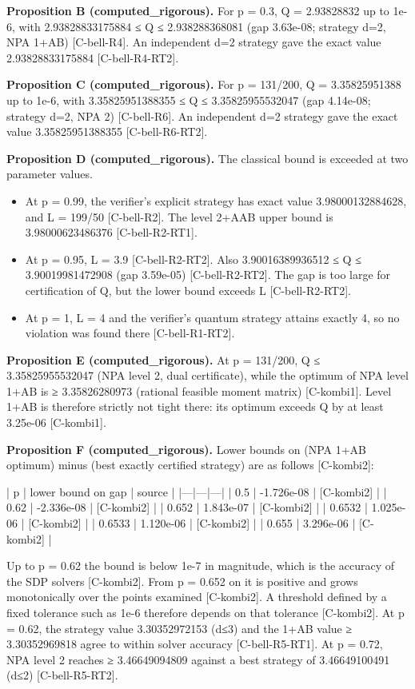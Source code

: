 \documentclass[10pt,twocolumn]{article}
\begin{document}
\textbf{Proposition B (computed_rigorous).} For p = 0.3, Q = 2.93828832 up to 1e-6, with 2.93828833175884 ≤ Q ≤ 2.938288368081 (gap 3.63e-08; strategy d=2, NPA 1+AB) {\scriptsize[C-bell-R4]}. An independent d=2 strategy gave the exact value 2.93828833175884 {\scriptsize[C-bell-R4-RT2]}.

\textbf{Proposition C (computed_rigorous).} For p = 131/200, Q = 3.35825951388 up to 1e-6, with 3.35825951388355 ≤ Q ≤ 3.35825955532047 (gap 4.14e-08; strategy d=2, NPA 2) {\scriptsize[C-bell-R6]}. An independent d=2 strategy gave the exact value 3.35825951388355 {\scriptsize[C-bell-R6-RT2]}.

\textbf{Proposition D (computed_rigorous).} The classical bound is exceeded at two parameter values.
\begin{itemize}
\item At p = 0.99, the verifier's explicit strategy has exact value 3.98000132884628, and L = 199/50 {\scriptsize[C-bell-R2]}. The level 2+AAB upper bound is 3.98000623486376 {\scriptsize[C-bell-R2-RT1]}.
\item At p = 0.95, L = 3.9 {\scriptsize[C-bell-R2-RT2]}. Also 3.90016389936512 ≤ Q ≤ 3.90019981472908 (gap 3.59e-05) {\scriptsize[C-bell-R2-RT2]}. The gap is too large for certification of Q, but the lower bound exceeds L {\scriptsize[C-bell-R2-RT2]}.
\item At p = 1, L = 4 and the verifier's quantum strategy attains exactly 4, so no violation was found there {\scriptsize[C-bell-R1-RT2]}.
\end{itemize}

\textbf{Proposition E (computed_rigorous).} At p = 131/200, Q ≤ 3.35825955532047 (NPA level 2, dual certificate), while the optimum of NPA level 1+AB is ≥ 3.35826280973 (rational feasible moment matrix) {\scriptsize[C-kombi1]}. Level 1+AB is therefore strictly not tight there: its optimum exceeds Q by at least 3.25e-06 {\scriptsize[C-kombi1]}.

\textbf{Proposition F (computed_rigorous).} Lower bounds on (NPA 1+AB optimum) minus (best exactly certified strategy) are as follows {\scriptsize[C-kombi2]}:

| p | lower bound on gap | source |
|---|---|---|
| 0.5 | -1.726e-08 | {\scriptsize[C-kombi2]} |
| 0.62 | -2.336e-08 | {\scriptsize[C-kombi2]} |
| 0.652 | 1.843e-07 | {\scriptsize[C-kombi2]} |
| 0.6532 | 1.025e-06 | {\scriptsize[C-kombi2]} |
| 0.6533 | 1.120e-06 | {\scriptsize[C-kombi2]} |
| 0.655 | 3.296e-06 | {\scriptsize[C-kombi2]} |

Up to p = 0.62 the bound is below 1e-7 in magnitude, which is the accuracy of the SDP solvers {\scriptsize[C-kombi2]}. From p = 0.652 on it is positive and grows monotonically over the points examined {\scriptsize[C-kombi2]}. A threshold defined by a fixed tolerance such as 1e-6 therefore depends on that tolerance {\scriptsize[C-kombi2]}. At p = 0.62, the strategy value 3.30352972153 (d≤3) and the 1+AB value ≥ 3.30352969818 agree to within solver accuracy {\scriptsize[C-bell-R5-RT1]}. At p = 0.72, NPA level 2 reaches ≥ 3.46649094809 against a best strategy of 3.46649100491 (d≤2) {\scriptsize[C-bell-R5-RT2]}.
\end{document}
